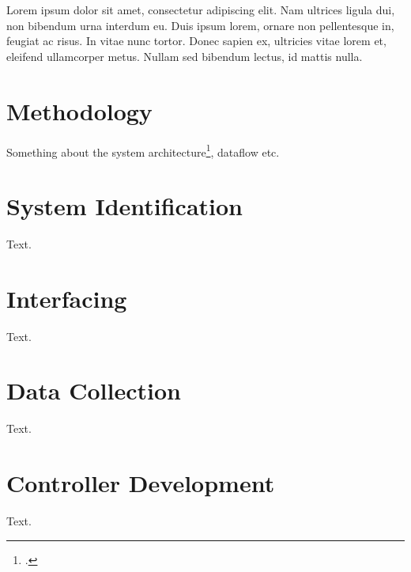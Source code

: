 Lorem ipsum dolor sit amet, consectetur adipiscing elit. Nam ultrices ligula dui, non bibendum urna interdum eu. Duis ipsum lorem, ornare non pellentesque in, feugiat ac risus. In vitae nunc tortor. Donec sapien ex, ultricies vitae lorem et, eleifend ullamcorper metus. Nullam sed bibendum lectus, id mattis nulla.

\section{Methodology}
Something about the system architecture\footcite[]{book}, dataflow etc.

\section{System Identification}
Text.

\section{Interfacing}
Text.

\newpage
\section{Data Collection}
Text.

\section{Controller Development}
Text.